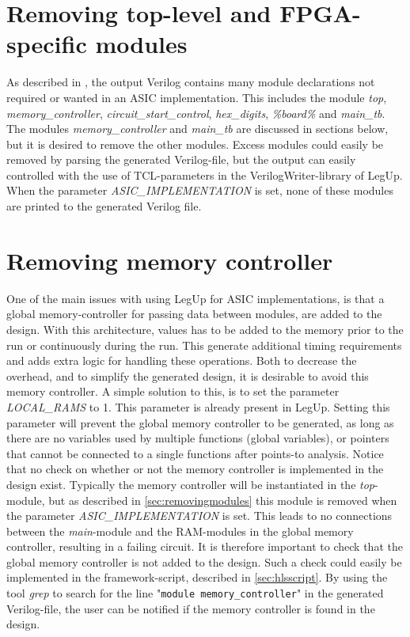 \section{\label{sec:removingmodules}Removing top-level and FPGA-specific modules}
As described in \cite{holm2015pro}, the output Verilog contains many module declarations not required or wanted in an ASIC implementation. This includes the module \textit{top}, \textit{memory\_controller}, \textit{circuit\_start\_control}, \textit{hex\_digits}, \textit{\%board\%} and \textit{main\_tb}. The modules \textit{memory\_controller} and \textit{main\_tb} are discussed in sections below, but it is desired to remove the other modules. Excess modules could easily be removed by parsing the generated Verilog-file, but the output can easily controlled with the use of TCL-parameters in the VerilogWriter-library of LegUp. When the parameter \textit{ASIC\_IMPLEMENTATION} is set, none of these modules are printed to the generated Verilog file.

\section{Removing memory controller}
One of the main issues with using LegUp for ASIC implementations, is that a global memory-controller for passing data between modules, are added to the design. With this architecture, values has to be added to the memory prior to the run or continuously during the run. This generate additional timing requirements and adds extra logic for handling these operations. Both to decrease the overhead, and to simplify the generated design, it is desirable to avoid this memory controller. A simple solution to this, is to set the parameter \textit{LOCAL\_RAMS} to 1. This parameter is already present in LegUp. Setting this parameter will prevent the global memory controller to be generated, as long as there are no variables used by multiple functions (global variables), or pointers that cannot be connected to a single functions after points-to analysis. Notice that no check on whether or not the memory controller is implemented in the design exist. Typically the memory controller will be instantiated in the \textit{top}-module, but as described in \cref{sec:removingmodules} this module is removed when the parameter \textit{ASIC\_IMPLEMENTATION} is set. This leads to no connections between the \textit{main}-module and the RAM-modules in the global memory controller, resulting in a failing circuit. It is therefore important to check that the global memory controller is not added to the design. Such a check could easily be implemented in the framework-script, described in \cref{sec:hlsscript}. By using the tool \textit{grep} to search for the line "\verb!module memory_controller!" in the generated Verilog-file, the user can be notified if the memory controller is found in the design.

